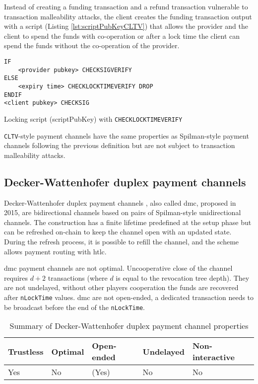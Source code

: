 Instead of creating a funding transaction and a refund transaction vulnerable to
transaction malleability attacks, the client creates the funding transaction
output with a script (Listing \ref{lst:scriptPubKeyCLTV}) that allows the
provider and the client to spend the funds
with co-operation or after a lock time the client can spend the funds without
the co-operation of the provider.

\begin{listing}
  \begin{verbatim}
IF
    <provider pubkey> CHECKSIGVERIFY
ELSE
    <expiry time> CHECKLOCKTIMEVERIFY DROP
ENDIF
<client pubkey> CHECKSIG
  \end{verbatim}
	\caption{Locking script (scriptPubKey) with \texttt{CHECKLOCKTIMEVERIFY}}
	\label{lst:scriptPubKeyCLTV}
\end{listing}

\texttt{CLTV}-style payment channels have the same properties as Spilman-style payment
channels following the previous definition but are not subject to transaction
malleability attacks.


\subsection{Decker-Wattenhofer duplex payment channels}

Decker-Wattenhofer duplex payment channels \cite{Decker2015fast}, also called
\gls{dmc}, proposed in 2015, are bidirectional channels based on pairs of
Spilman-style unidirectional channels. The construction has a finite lifetime
predefined at the setup phase but can be refreshed on-chain to keep the channel
open with an updated state. During the refresh process, it is possible to refill
the channel, and the scheme allows payment routing with \gls{htlc}.

\gls{dmc} payment channels are not optimal. Uncooperative close of the channel
requires $d + 2$ transactions (where $d$ is equal to the revocation tree depth).
They are not undelayed, without other players cooperation the funds are
recovered after \texttt{nLockTime} values. \gls{dmc} are not open-ended, a
dedicated transaction  needs to be broadcast before the end of the
\texttt{nLockTime}.

\begin{table}[h]
  \begin{tabularx}{\textwidth}{ | X | l | l | l | X |}
  \hline
  Trustless & Optimal & Open-ended & Undelayed & Non-interactive \\ \hline \hline
  Yes & No & (Yes) & No & No \\
  \hline
  \end{tabularx}
  \caption{Summary of Decker-Wattenhofer duplex payment channel properties}
  \label{fig:summaryDeckerWattenhoferPaymentChannel}
\end{table}

